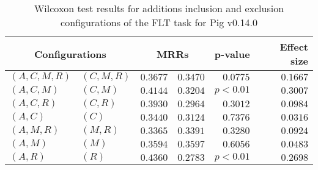 
\begin{table}
\begin{spacing}{1.2}
\centering
\caption{Wilcoxon test results for additions inclusion and exclusion configurations of the FLT task for Pig v0.14.0}
\label{table:versus-wilcox-pig-flt-additions}
\begin{tabular}{ll|rr|rr}
\toprule
      \multicolumn{2}{c|}{Configurations} &          \multicolumn{2}{c|}{MRRs} &       p-value & Effect size \\
\midrule
 $(A,C,M,R)$ &  $(C,M,R)$ & $0.3677$ & $0.3470$ & $0.0775$ &    $0.1667$ \\
   $(A,C,M)$ &    $(C,M)$ & $0.4144$ & $0.3204$ & $p<0.01$ &    $0.3007$ \\
   $(A,C,R)$ &    $(C,R)$ & $0.3930$ & $0.2964$ & $0.3012$ &    $0.0984$ \\
     $(A,C)$ &      $(C)$ & $0.3440$ & $0.3124$ & $0.7376$ &    $0.0316$ \\
   $(A,M,R)$ &    $(M,R)$ & $0.3365$ & $0.3391$ & $0.3280$ &    $0.0924$ \\
     $(A,M)$ &      $(M)$ & $0.3594$ & $0.3597$ & $0.6056$ &    $0.0483$ \\
     $(A,R)$ &      $(R)$ & $0.4360$ & $0.2783$ & $p<0.01$ &    $0.2698$ \\
\bottomrule
\end{tabular}

\end{spacing}
\end{table}

